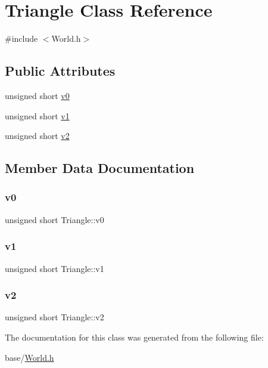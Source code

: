 \hypertarget{classTriangle}{}\section{Triangle Class Reference}
\label{classTriangle}


{\ttfamily \#include $<$World.\+h$>$}

\subsection*{Public Attributes}
\begin{DoxyCompactItemize}
\item 
unsigned short \mbox{\hyperlink{classTriangle_aaec4070897c26280c8aa742e7bc65ed9}{v0}}
\item 
unsigned short \mbox{\hyperlink{classTriangle_ad8dd98e37245eeef0255d5ed958515fa}{v1}}
\item 
unsigned short \mbox{\hyperlink{classTriangle_a457a323d6c61cbc4e11f4395dba31682}{v2}}
\end{DoxyCompactItemize}


\subsection{Member Data Documentation}
\mbox{\label{classTriangle_aaec4070897c26280c8aa742e7bc65ed9}} 
\subsubsection{\texorpdfstring{v0}{v0}}
{\footnotesize\ttfamily unsigned short Triangle\+::v0}

\mbox{\label{classTriangle_ad8dd98e37245eeef0255d5ed958515fa}} 
\subsubsection{\texorpdfstring{v1}{v1}}
{\footnotesize\ttfamily unsigned short Triangle\+::v1}

\mbox{\label{classTriangle_a457a323d6c61cbc4e11f4395dba31682}} 
\subsubsection{\texorpdfstring{v2}{v2}}
{\footnotesize\ttfamily unsigned short Triangle\+::v2}



The documentation for this class was generated from the following file\+:\begin{DoxyCompactItemize}
\item 
base/\mbox{\hyperlink{World_8h}{World.\+h}}\end{DoxyCompactItemize}
